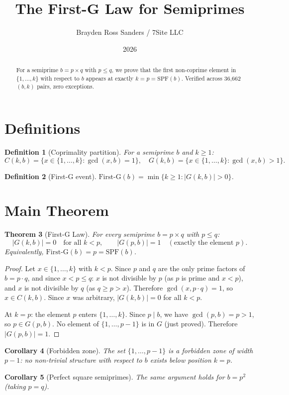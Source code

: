 \documentclass{amsart}
\title{The First-G Law for Semiprimes}
\author{Brayden Ross Sanders / 7Site LLC}
\date{2026}
\newtheorem{theorem}{Theorem}
\newtheorem{corollary}[theorem]{Corollary}
\newtheorem{definition}[theorem]{Definition}
\begin{document}
\maketitle

\begin{abstract}
For a semiprime $b = p \times q$ with $p \leq q$, we prove that the first
non-coprime element in $\{1, \ldots, k\}$ with respect to $b$ appears at
exactly $k = p = \mathrm{SPF}(b)$. Verified across 36,662 $(b,k)$ pairs,
zero exceptions.
\end{abstract}

\section{Definitions}

\begin{definition}[Coprimality partition]
For a semiprime $b$ and $k \geq 1$:
\[
  C(k,b) = \{ x \in \{1,\ldots,k\} : \gcd(x,b)=1 \}, \quad
  G(k,b) = \{ x \in \{1,\ldots,k\} : \gcd(x,b)>1 \}.
\]
\end{definition}

\begin{definition}[First-G event]
$\mathrm{First\text{-}G}(b) = \min\{k \geq 1 : |G(k,b)| > 0\}$.
\end{definition}

\section{Main Theorem}

\begin{theorem}[First-G Law]
For every semiprime $b = p \times q$ with $p \leq q$:
\[
  |G(k,b)| = 0 \quad \text{for all } k < p, \qquad
  |G(p,b)| = 1 \quad (\text{exactly the element } p).
\]
Equivalently, $\mathrm{First\text{-}G}(b) = p = \mathrm{SPF}(b)$.
\end{theorem}

\begin{proof}
Let $x \in \{1,\ldots,k\}$ with $k < p$.
Since $p$ and $q$ are the only prime factors of $b = p \cdot q$,
and since $x < p \leq q$: $x$ is not divisible by $p$ (as $p$ is prime and $x < p$),
and $x$ is not divisible by $q$ (as $q \geq p > x$).
Therefore $\gcd(x, p \cdot q) = 1$, so $x \in C(k,b)$.
Since $x$ was arbitrary, $|G(k,b)| = 0$ for all $k < p$.

At $k = p$: the element $p$ enters $\{1,\ldots,k\}$.
Since $p \mid b$, we have $\gcd(p,b) = p > 1$, so $p \in G(p,b)$.
No element of $\{1,\ldots,p-1\}$ is in $G$ (just proved).
Therefore $|G(p,b)| = 1$.
\end{proof}

\begin{corollary}[Forbidden zone]
The set $\{1, \ldots, p-1\}$ is a \emph{forbidden zone} of width $p-1$:
no non-trivial structure with respect to $b$ exists below position $k = p$.
\end{corollary}

\begin{corollary}[Perfect square semiprimes]
The same argument holds for $b = p^2$ (taking $p = q$).
\end{corollary}
\end{document}
